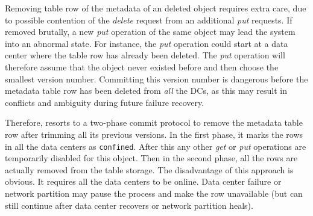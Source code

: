 Removing table row of the metadata of an deleted object requires extra care, due to possible
contention of the \emph{delete} request from an additional \emph{put} requests. If removed brutally, a new {\em put}
operation of the same object may lead the system into an abnormal state. For
instance, the {\em put} operation could start at a data center where the table
row has already been deleted. The {\em put} operation will therefore assume that the object
never existed before and then choose the smallest version number. Committing
this version number is dangerous before the metadata table row has been deleted from
\emph{all} the DCs, as this may result in conflicts and ambiguity during future failure
recovery.



Therefore, {\name} resorts to a two-phase commit protocol to remove the metadata table row after 
trimming all its previous versions. In the
first phase, it marks the rows in all the data centers as \texttt{confined}.
After this any other {\em get} or {\em put} operations are temporarily disabled
for this object. Then in the second phase, all the rows are actually removed
from the table storage. The disadvantage of this approach is obvious. It
requires all the data centers to be online. Data center failure or network
partition may pause the process and make the row unavailable (but can still
continue after data center recovers or network partition heals).  





